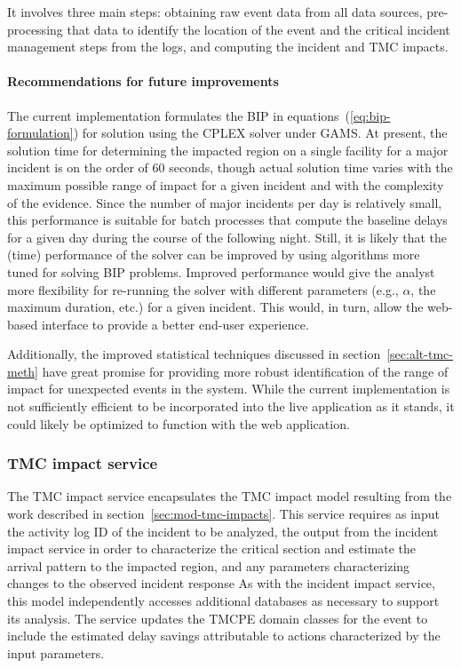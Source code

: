 \documentclass[12pt]{report}
\newcounter{time}
\begin{document}
It involves three main steps: obtaining raw event data from all data sources,
pre-processing that data to identify the location of the event and the critical
incident management steps from the logs, and computing the incident and TMC
impacts.


\paragraph{Recommendations for future improvements}

The current implementation formulates the \ac{BIP} in
equations~(\ref{eq:bip-formulation}) for solution using the \ac{CPLEX} solver
under \ac{GAMS}.  At present, the solution time for determining the impacted
region on a single facility for a major incident is on the order of 60 seconds,
though actual solution time varies with the maximum possible range of impact for
a given incident and with the complexity of the evidence.  Since the number of
major incidents per day is relatively small, this performance is suitable for
batch processes that compute the baseline delays for a given day during the
course of the following night.  Still, it is likely that the (time) performance
of the solver can be improved by using algorithms more tuned for solving
\ac{BIP} problems.  Improved performance would give the analyst more flexibility
for re-running the solver with different parameters (e.g., $\alpha$, the maximum
duration, etc.) for a given incident.  This would, in turn, allow the web-based
interface to provide a better end-user experience.

Additionally, the improved statistical techniques discussed in
section~\ref{sec:alt-tmc-meth} have great promise for providing more robust
identification of the range of impact for unexpected events in the system.
While the current implementation is not sufficiently efficient to be
incorporated into the live application as it stands, it could likely be
optimized to function with the web application.


\subsubsection{TMC impact service}
\label{sec:tmc-impact-service}
The \ac{TMC} impact service encapsulates the \ac{TMC} impact model resulting
from the work described in section~\ref{sec:mod-tmc-impacts}.  This
service requires as input the activity log ID of the incident to be
analyzed, the output from the incident impact service in order to
characterize the critical section and estimate the arrival pattern to
the impacted region, and any parameters characterizing changes to the
observed incident response As with the incident impact service, this
model independently accesses additional databases as necessary to
support its analysis.  The service updates the \ac{TMCPE} domain classes
for the event to include the estimated delay savings attributable to
actions characterized by the input parameters.
\end{document}
